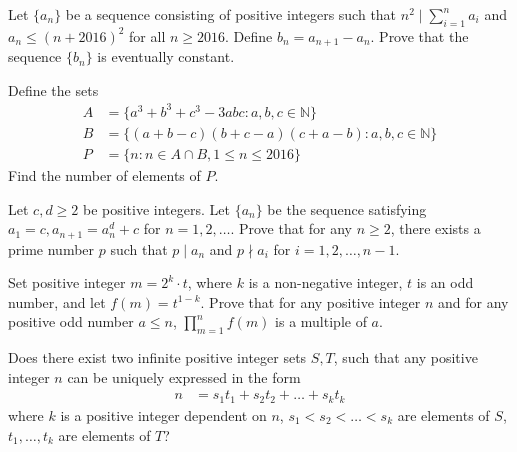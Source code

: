 \documentclass[problems.tex]{subfile}
\begin{document}
	\begin{problem}
		Let $\{ a_n\}$ be a sequence consisting of positive integers such that $n^2 \mid \sum_{i=1}^{n}{a_i}$ and $a_n\leq (n+2016)^2$ for all $n\geq 2016$.
		Define $b_n=a_{n+1}-a_n$. Prove that the sequence $\{ b_n\}$ is eventually constant. %
	\end{problem}

	\begin{problem}
		Define the sets
		\begin{align*}
			A &=\{a^3+b^3+c^3-3abc:a,b,c\in\mathbb{N}\}\\
			B &=\{(a+b-c)(b+c-a)(c+a-b):a,b,c\in\mathbb{N}\}\\
			P &=\{n:n\in A\cap B,1\le n\le 2016\}
		\end{align*}
		Find the number of elements of $P$. %
	\end{problem}

	\begin{problem}
		Let $c,d \geq 2$ be positive integers. Let $\{a_n\}$ be the sequence satisfying $a_1 = c, a_{n+1} = a_n^d + c$ for $n = 1,2,\dots$.
		Prove that for any $n \geq 2$, there exists a prime number $p$ such that $p\mid a_n$ and $p \nmid a_i$ for $i = 1,2,\dots, n-1$. %
	\end{problem}

	\begin{problem}
		Set positive integer $m=2^k\cdot t$, where $k$ is a non-negative integer, $t$ is an odd number, and let $f(m)=t^{1-k}$. Prove that for any positive integer $n$ and for any positive odd number $a\le n$, $\prod_{m=1}^n f(m)$ is a multiple of $a$. %
	\end{problem}

	\begin{problem}
		Does there exist two infinite positive integer sets $S,T$, such that any positive integer $n$ can be uniquely expressed in the form
			\begin{align*}
				n
					& =s_1t_1+s_2t_2+\ldots+s_kt_k
			\end{align*}
		where $k$ is a positive integer dependent on $n$, $s_1<s_2<\dots<s_k$ are elements of $S$, $t_1,\dots, t_k$ are elements of $T$? %
	\end{problem}
\end{document}
